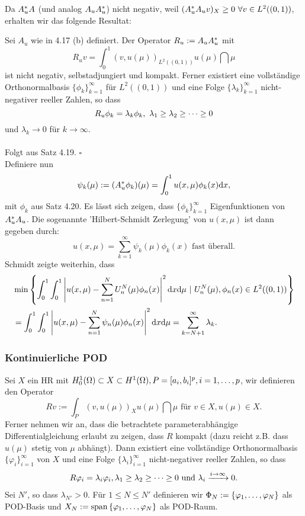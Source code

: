 Da $A_u^\ast A$ (und analog $A_uA_u^\ast$) nicht negativ, weil $(A_u^\ast A_u v)_X\ge 0 ~\forall v\in L^2((0,1))$, erhalten wir das folgende Resultat:

Sei $A_u$ wie in 4.17 (b) definiert.
Der Operator $R_u := A_uA_u^\ast$ mit
\[
R_u v = \int_0^1 (v,u(\mu))_{L^2((0,1))} u(\mu)\dint \mu
\]
ist nicht negativ, selbstadjungiert und kompakt.
Ferner existiert eine vollständige Orthonormalbasis $\{\phi_k\}_{k=1}^\infty$ für $L^2((0,1))$ und eine Folge $\{\lambda_k\}_{k=1}^\infty$ nicht-negativer reeller Zahlen, so dass
\[
R_u\phi_k= \lambda_k\phi_k,~\lambda_1\ge \lambda_2\ge \dots \ge0
\]
und $\lambda_k\to 0$ für $k\to \infty$.\\

\\
Folgt aus Satz 4.19.
\hfill $\square$\\

Definiere nun
\[
\psi_k(\mu):= (A_u^\ast\phi_k)(\mu) = \int_0^1 u(x,\mu)\phi_k(x)\mathrm{d} x,
\]
mit $\phi_k$ aus Satz 4.20.
Es lässt sich zeigen, dass $\{\phi_k\}_{k=1}^\infty$ Eigenfunktionen von $A_u^\ast A_u$.
Die sogenannte 'Hilbert-Schmidt Zerlegung' von $u(x,\mu)$ ist dann gegeben durch:
\[
u(x,\mu) = \sum_{k=1}^{\infty} \psi_k(\mu)\phi_k(x) \text{ fast überall.}
\]
Schmidt zeigte weiterhin, dass
\begin{align*}
&\min \left\{\int_0^1\int_0^1 \left\vert u(x,\mu)-\sum_{n=1}^{N}U_n^N(\mu)\phi_n(x)\right\vert^2\mathrm{d} x\mathrm{d} \mu~|~ U_n^N(\mu),\phi_n(x)\in L^2((0,1))\right\}\\
&= \int_0^1\int_0^1 \left\vert u(x,\mu)-\sum_{n=1}^{N}\psi_n(\mu)\phi_n(x)\right\vert^2\mathrm{d} x\mathrm{d} \mu = \sum_{k=N+1}^{\infty} \lambda_k.
\end{align*}

\subsubsection{Kontinuierliche POD}
Sei $X$ ein HR mit $H_0^1(\Omega)\subset X\subset H^1(\Omega), P=[a_i,b_i]^p,i=1, \dots ,p$, wir definieren den Operator
\[
Rv := \int_P (v,u(\mu))_X u(\mu)\dint \mu \text{ für } v\in X,u(\mu)\in X.
\]
Ferner nehmen wir an, dass die betrachtete parameterabhängige Differentialgleichung erlaubt zu zeigen, dass $R$ kompakt (dazu reicht z.B. dass $u(\mu)$ stetig von $\mu$ abhängt).
Dann existiert eine vollständige Orthonormalbasis $\{\varphi_i\}_{i=1}^\infty$ von $X$ und eine Folge $\{\lambda_i\}_{i=1}^\infty$ nicht-negativer reeller Zahlen, so dass
\begin{align}
R\varphi_i = \lambda_i\varphi_i, \lambda_1\ge \lambda_2\ge \dots \ge 0 \text{ und } \lambda_i \xrightarrow{i\to \infty} 0.
\end{align}
Sei $N'$, so dass $\lambda_{N'}>0$.
Für $1\le N\le N'$ definieren wir $\Phi_N:=\left\{\varphi_1, \dots ,\varphi_N\right\}$ als POD-Basis und $X_N:= \operatorname{span}\left\{\varphi_1, \dots ,\varphi_N\right\}$ als POD-Raum.\\

